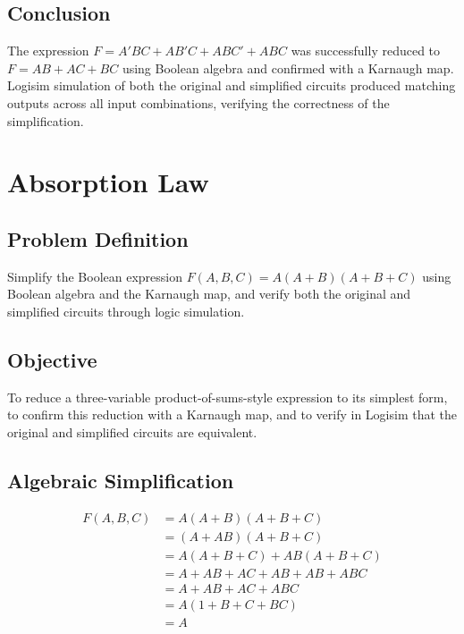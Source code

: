 \documentclass[12pt]{article}
\begin{document}
\subsection*{Conclusion}
The expression $F = A'BC + AB'C + ABC' + ABC$ was successfully reduced to $F = AB + AC + BC$ using Boolean algebra and confirmed with a Karnaugh map. Logisim simulation of both the original and simplified circuits produced matching outputs across all input combinations, verifying the correctness of the simplification.

\vspace{2cm}

\section{Absorption Law}

\subsection*{Problem Definition}
Simplify the Boolean expression $F(A,B,C) = A(A+B)(A+B+C)$ using Boolean algebra and the Karnaugh map, and verify both the original and simplified circuits through logic simulation.

\subsection*{Objective}
To reduce a three-variable product-of-sums-style expression to its simplest form, to confirm this reduction with a Karnaugh map, and to verify in Logisim that the original and simplified circuits are equivalent.

\subsection*{Algebraic Simplification}
\begin{align*}
F(A,B,C) &= A(A+B)(A+B+C) \\
&= (A + AB)(A+B+C) \\
&= A(A+B+C) + AB(A+B+C) \\
&= A + AB + AC + AB + AB + ABC \\
&= A + AB + AC + ABC \\
&= A(1 + B + C + BC) \\
&= A
\end{align*}
\end{document}
